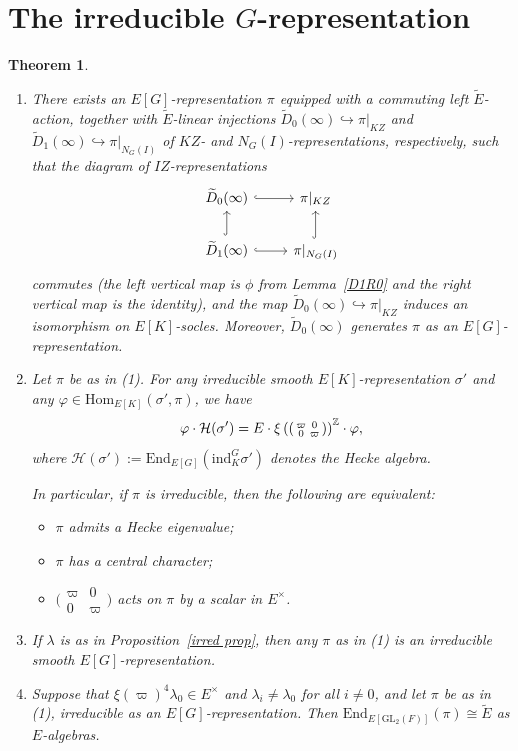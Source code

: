 \documentclass[a4paper,10pt,twoside]{amsart}
\newtheorem{theorem}{Theorem}[section]
\theoremstyle{definition}
\numberwithin{equation}{section}
\begin{document}
\section{The irreducible \texorpdfstring{$G$}{G}-representation}

\begin{theorem}\label{main thm}
\begin{enumerate}
\item\label{1} There exists an $E[G]$-representation $\pi$ equipped with a commuting left $\widetilde{E}$-action, together with \(\widetilde E\)-linear injections
\(\widetilde D_0(\infty)\hookrightarrow\pi|_{KZ}\) and \(\widetilde D_1(\infty)\hookrightarrow\pi|_{N_G(I)}\)
of \(KZ\)- and \(N_G(I)\)-representations, respectively,
such that the diagram of \(IZ\)-representations
\[
\begin{tikzcd}
\widetilde{D}_0(\infty) \arrow[r, hook] 
& \pi|_{KZ} \\
\widetilde{D}_1(\infty) \arrow[r, hook] \arrow[u, hook]
& \pi|_{N_G(I)} \arrow[u, hook]
\end{tikzcd}
\]
commutes (the left vertical map is \(\phi\) from Lemma~\ref{D1R0}
and the right vertical map is the identity), and the map \(\widetilde D_0(\infty)\hookrightarrow\pi|_{KZ}\)
induces an isomorphism on \(E[K]\)-socles. Moreover, $\widetilde{D}_0(\infty)$ generates $\pi$ as an $E[G]$-representation.

\item Let $\pi$ be as in (1). For any irreducible smooth $E[K]$-representation $\sigma'$ and any $\varphi \in \mathrm{Hom}_{E[K]}(\sigma', \pi)$, we have
\[
\varphi \cdot \mathcal{H}(\sigma') 
= E \cdot \xi\left(
\begin{psmallmatrix}
\varpi&0\\
0&\varpi
\end{psmallmatrix}
\right)^\mathbb{Z} \cdot \varphi,
\]
where $\mathcal{H}(\sigma') := \mathrm{End}_{E[G]}(\mathrm{ind}_K^G \sigma')$ denotes the Hecke algebra.

In particular, if $\pi$ is irreducible, then the following are equivalent:
\begin{itemize}
\item $\pi$ admits a Hecke eigenvalue;
\item $\pi$ has a central character;
\item $\bigl(\begin{smallmatrix} \varpi & 0 \\ 0 & \varpi \end{smallmatrix}\bigr)$ acts on $\pi$ by a scalar in $E^\times$.
\end{itemize}

\item If $\lambda$ is as in Proposition~\ref{irred prop}, then any $\pi$ as in (1) is an irreducible smooth $E[G]$-representation.

\item Suppose that $\xi(\varpi)^4\lambda_0 \in E^\times$ and $\lambda_i \neq \lambda_0$ for all $i \neq 0$, and let $\pi$ be as in (1), irreducible as an $E[G]$-representation. Then $\mathrm{End}_{E[\mathrm{GL}_2(F)]}(\pi) \cong \widetilde{E}
$ as $E$-algebras.
\end{enumerate}
\end{theorem}
\end{document}
